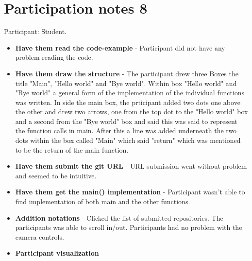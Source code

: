 \section{Participation notes 8}
Participant: Student.

\begin{itemize}
    \item \textbf{Have them read the code-example} - Participant did not have any problem reading the code.
    \item \textbf{Have them draw the structure} - The participant drew three Boxes the title "Main", "Hello world" and "Bye world". Within box "Hello world" and "Bye world" a general form of the implementation of the individual functions was written. In side the main box, the prticipant added two dots one above the other and drew two arrows, one from the top dot to the "Hello world" box and a second from the "Bye world" box and said this was said to represent the function calls in main. After this a line was added underneath the two dots within the box called "Main" which said "return" which was mentioned to be the return of the main function.
    \item \textbf{Have them submit the git URL} - URL submission went without problem and seemed to be intuitive.
    \item \textbf{Have them get the main() implementation} - Participant wasn't able to find implementation of both main and the other functions.
    \item \textbf{Addition notations} - Clicked the list of submitted repositories. The participants was able to scroll in/out. Participants had no problem with the camera controls.
    \item \textbf{Participant visualization} 
\end{itemize}